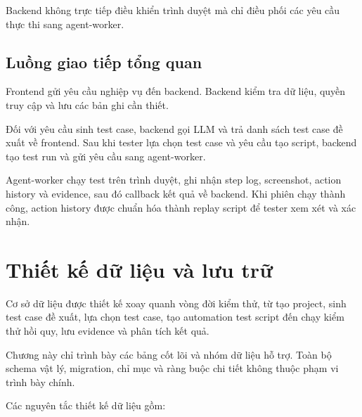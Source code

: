 Backend không trực tiếp điều khiển trình duyệt mà chỉ điều phối các yêu cầu thực thi sang agent-worker.

\subsection{Luồng giao tiếp tổng quan}

Frontend gửi yêu cầu nghiệp vụ đến backend. Backend kiểm tra dữ liệu, quyền truy cập và lưu các bản ghi cần thiết.

Đối với yêu cầu sinh test case, backend gọi LLM và trả danh sách test case đề xuất về frontend. Sau khi tester lựa chọn test case và yêu cầu tạo script, backend tạo test run và gửi yêu cầu sang agent-worker.

Agent-worker chạy test trên trình duyệt, ghi nhận step log, screenshot, action history và evidence, sau đó callback kết quả về backend. Khi phiên chạy thành công, action history được chuẩn hóa thành replay script để tester xem xét và xác nhận.

\section{Thiết kế dữ liệu và lưu trữ}

Cơ sở dữ liệu được thiết kế xoay quanh vòng đời kiểm thử, từ tạo project, sinh test case đề xuất, lựa chọn test case, tạo automation test script đến chạy kiểm thử hồi quy, lưu evidence và phân tích kết quả.

Chương này chỉ trình bày các bảng cốt lõi và nhóm dữ liệu hỗ trợ. Toàn bộ schema vật lý, migration, chỉ mục và ràng buộc chi tiết không thuộc phạm vi trình bày chính.

Các nguyên tắc thiết kế dữ liệu gồm:

